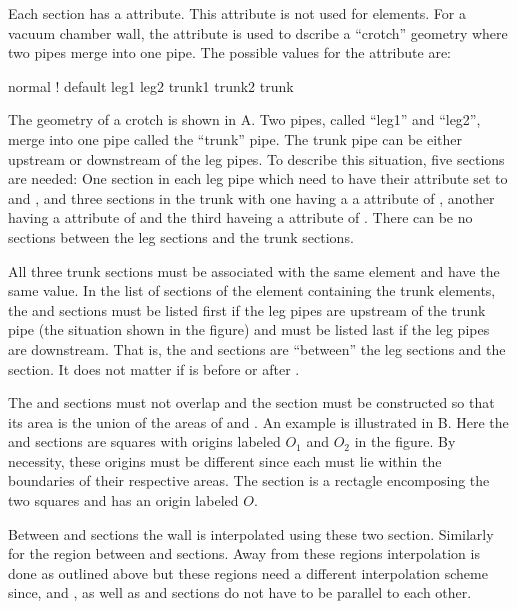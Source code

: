 
Each section has a  attribute. This attribute is not used for 
 elements. For a vacuum chamber wall, the  
attribute is used to dscribe a ``crotch'' geometry where
two pipes merge into one pipe. The possible values for the  
attribute are:
\begin{example}
  normal     ! default
  leg1
  leg2
  trunk1
  trunk2
  trunk
\end{example}
The geometry of a crotch is shown in A. Two pipes,
called ``leg1'' and ``leg2'', merge into one pipe called the ``trunk''
pipe.  The trunk pipe can be either upstream or downstream of the leg
pipes.  To describe this situation, five sections are needed: One
section in each leg pipe which need to have their  attribute
set to  and , and three sections in the trunk with
one having a a  attribute of , another having a
 attribute of  and the third haveing a 
attribute of . There can be no sections between the leg
sections and the trunk sections.

All three trunk sections must be associated with the same element and
have the same  value. In the list of sections of the element
containing the trunk elements, the  and 
sections must be listed first if the leg pipes are upstream of the
trunk pipe (the situation shown in the figure) and must be listed last
if the leg pipes are downstream. That is, the  and
 sections are ``between'' the leg sections and the
 section. It does not matter if  is before or
after .

The  and  sections must not overlap and the
 section must be constructed so that its area is the union
of the areas of  and . An example is illustrated
in B. Here the  and  sections are
squares with origins labeled $O_1$ and $O_2$ in the figure. By
necessity, these origins must be different since each must lie within
the boundaries of their respective areas. The  section is a
rectagle encomposing the two squares and has an origin labeled $O$.

Between  and  sections the wall is interpolated
using these two section. Similarly for the region between 
and  sections. Away from these regions interpolation is
done as outlined above but these regions need a different
interpolation scheme since,  and , as well as
 and  sections do not have to be parallel to each
other.

